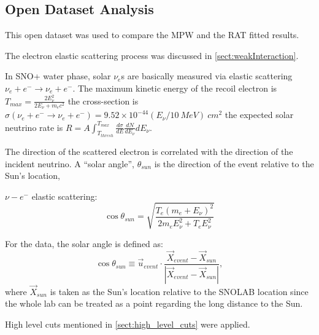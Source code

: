 \subsection{Open Dataset Analysis}

This open dataset was used to compare the MPW and the RAT fitted results.

The electron elastic scattering process was discussed in \ref{sect:weakInteraction}.

In SNO+ water phase, solar $\nu_e$s are basically measured via elastic scattering $\nu_e+e^-\to \nu_e+e^-$. The maximum kinetic energy of the recoil electron is
$T_{max}=\frac{2E^2_\nu}{2E_\nu+m_e c^2}$
the cross-section is $\sigma(\nu_e+e^-\to \nu_e+e^-)=9.52\times 10^{-44}(E_\nu/10~MeV)~cm^2$
the expected solar neutrino rate is 
$R=A\int_{T_{thresh}}^{T_{max}}\frac{d\sigma}{dE}\frac{dN}{dE_\nu}dE_\nu$.

The direction of the scattered electron is correlated with the direction of the incident neutrino.
A ``solar angle'', $\theta_{sun}$ is the direction of the event relative to the Sun's location,


$\nu-e^-$ elastic scattering: 
\begin{equation}\label{eq:costhetaSun}
\cos\theta_{sun}=\sqrt{\frac{T_e(m_e+E_\nu)^2}{2m_eE_\nu^2+T_eE_\nu^2}}
\end{equation}

For the data, the solar angle is defined as:
\begin{equation}
	\cos\theta_{sun}\equiv \vec u_{event}\cdot \frac{\vec{X}_{event}-\vec{X}_{sun}}{|\vec{X}_{event}-\vec{X}_{sun}|},
\end{equation}
where $\vec{X}_{sun}$ is taken as the Sun's location relative to the SNOLAB location since the whole lab can be treated as a point regarding the long distance to the Sun.



High level cuts mentioned in \ref{sect:high_level_cuts} were applied.

